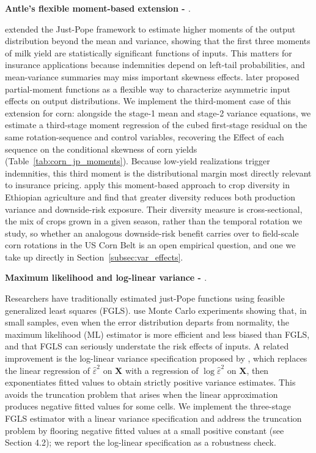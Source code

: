 \documentclass[12pt,letterpaper]{article}
\theoremstyle{remark}
\theoremstyle{remark}
\theoremstyle{plain}
\theoremstyle{definition}
\begin{document}
\medskip\noindent\textbf{Antle's flexible moment-based extension - \cite{antle1983, Antle2010}}. 

\cite{antle1983} extended the Just-Pope framework to estimate higher moments of the output distribution beyond the mean and variance, showing that the first three moments of milk yield are statistically significant functions of inputs. This matters for
insurance applications because indemnities depend on left-tail probabilities, and mean-variance summaries may miss important skewness effects. \cite{Antle2010} later proposed partial-moment functions as a flexible way to characterize asymmetric input effects on output distributions. We implement the third-moment case of this extension for corn: alongside the stage-1 mean and stage-2 variance equations, we estimate a third-stage moment regression of the cubed first-stage residual on the same rotation-sequence and control variables, recovering the Effect of each sequence on the conditional skewness of corn yields (Table~\ref{tab:corn_jp_moments}). Because low-yield realizations trigger indemnities, this third moment is the distributional margin most directly relevant to insurance pricing. \citet{difalco2009} apply this moment-based approach to crop diversity in Ethiopian agriculture and find that greater diversity reduces both production variance and downside-risk exposure. Their diversity measure is cross-sectional, the mix of crops grown in a given season, rather than the temporal rotation we study, so whether an analogous downside-risk benefit carries over to field-scale corn rotations in the US Corn Belt is an open empirical question, and one we take up directly in Section~\ref{subsec:var_effects}.

\medskip\noindent\textbf{Maximum likelihood and log-linear variance - \cite{Harvey1976, Saha1997}}. 

Researchers have traditionally estimated just-Pope functions using feasible generalized least squares (FGLS). \cite{Saha1997} use Monte Carlo experiments showing that, in small samples, even when the error distribution departs from normality, the maximum likelihood (ML) estimator is more efficient and less biased than FGLS, and that FGLS can seriously understate the risk effects of inputs. A related improvement is the log-linear variance specification proposed by \cite{Harvey1976}, which replaces the linear regression of $\hat{\varepsilon}^2$ on $\mathbf{X}$ with a regression of $\log \hat{\varepsilon}^2$ on $\mathbf{X}$, then exponentiates fitted values to obtain strictly positive variance estimates. This avoids the truncation problem that arises when the linear approximation produces negative fitted values for some cells. We implement the three-stage FGLS estimator with a linear variance specification and
address the truncation problem by flooring negative fitted values at a small positive constant (see Section 4.2); we report the log-linear specification as a robustness check.
\end{document}
